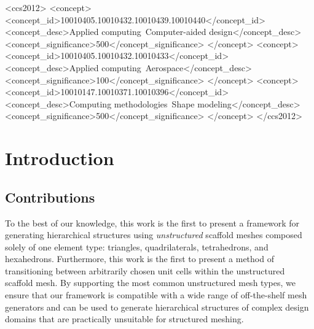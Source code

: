 \documentclass[acmtog]{acmart}
\begin{document}
\begin{CCSXML}
<ccs2012>
    <concept>
        <concept_id>10010405.10010432.10010439.10010440</concept_id>
        <concept_desc>Applied computing~Computer-aided design</concept_desc>
        <concept_significance>500</concept_significance>
        </concept>
    <concept>
        <concept_id>10010405.10010432.10010433</concept_id>
        <concept_desc>Applied computing~Aerospace</concept_desc>
        <concept_significance>100</concept_significance>
        </concept>
    <concept>
        <concept_id>10010147.10010371.10010396</concept_id>
        <concept_desc>Computing methodologies~Shape modeling</concept_desc>
        <concept_significance>500</concept_significance>
        </concept>
  </ccs2012>
\end{CCSXML}




\maketitle

\section{Introduction}

\subsection{Contributions}
To the best of our knowledge, this work is the first to present a framework for generating hierarchical structures using \textit{unstructured} scaffold meshes composed solely of one element type: triangles, quadrilaterals, tetrahedrons, and hexahedrons. Furthermore, this work is the first to present a method of transitioning between arbitrarily chosen unit cells within the unstructured scaffold mesh. By supporting the most common unstructured mesh types, we ensure that our framework is compatible with a wide range of off-the-shelf mesh generators and can be used to generate hierarchical structures of complex design domains that are practically unsuitable for structured meshing.
\end{document}

